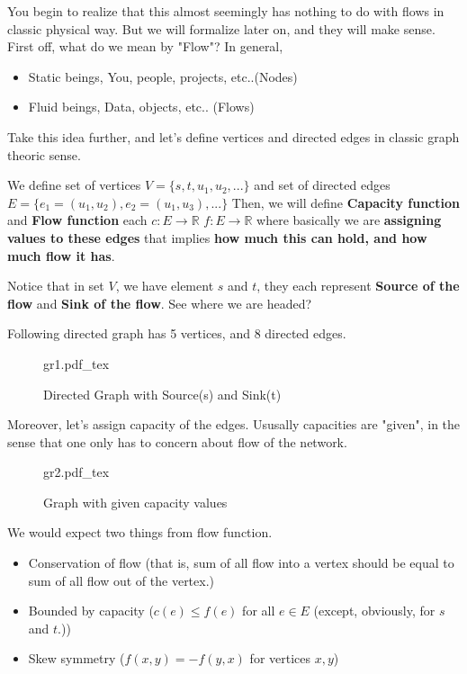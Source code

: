 \documentclass[12pt]{article}
\begin{document}
You begin to realize that this almost seemingly has nothing to do with flows in classic physical way. But we will formalize later on, and they will make sense.
First off, what do we mean by "Flow"? In general,
\begin{itemize}
  \item Static beings, You, people, projects, etc..(Nodes)
  \item Fluid beings, Data, objects, etc.. (Flows)
\end{itemize}
Take this idea further, and let's define vertices and directed edges in classic graph theoric sense.

We define set of vertices $V=\{s,t,u_1,u_2,... \}$ and set of directed edges $E = \{e_1 = (u_1,u_2), e_2 = (u_1,u_3), ...\}$ Then, we will define \textbf{Capacity function} and \textbf{Flow function} each $c:E\rightarrow \mathbb{R}$ $f:E\rightarrow \mathbb{R}$ where basically we are \textbf{assigning values to these edges} that implies \textbf{how much this can hold, and how much flow it has}.

Notice that in set $V$, we have element $s$ and $t$, they each represent \textbf{Source of the flow} and \textbf{Sink of the flow}. See where we are headed?

Following directed graph has 5 vertices, and 8 directed edges.


\begin{figure}[H]
	\centering
	\def\svgwidth{\columnwidth}
	{gr1.pdf_tex}
	\caption{Directed Graph with Source(s) and Sink(t)}
	\label{fig:gr1}
\end{figure}

Moreover, let's assign capacity of the edges. Ususally capacities are "given", in the sense that one only has to concern about flow of the network.

\begin{figure}[H]
	\centering
	\def\svgwidth{\columnwidth}
	{gr2.pdf_tex}
	\caption{Graph with given capacity values}
	\label{fig:gr2}
\end{figure}

We would expect two things from flow function.
\begin{itemize}
  \item Conservation of flow (that is, sum of all flow into a vertex should be equal to sum of all flow out of the vertex.)
  \item Bounded by capacity ($c(e)\leq f(e)$ for all $e\in E$ (except, obviously, for $s$ and $t$.))
  \item Skew symmetry ($f(x,y)=-f(y,x)$ for vertices $x,y$)
\end{itemize}
\end{document}
